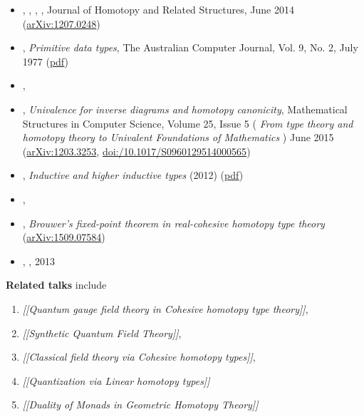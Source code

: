\begin{itemize}
\item {}, , , , Journal of Homotopy and Related Structures, June 2014 (\href{http://arxiv.org/abs/1207.0248}{arXiv:1207.0248})
\item {}, \emph{Primitive data types}, The Australian Computer Journal, Vol. 9, No. 2, July 1977 (\href{http://eprints.utas.edu.au/139/1/PrimitiveData.pdf}{pdf})
\item {}, 
\item {}, \emph{Univalence for inverse diagrams and homotopy canonicity}, Mathematical Structures in Computer Science, Volume 25, Issue 5 ( \emph{From type theory and homotopy theory to Univalent Foundations of Mathematics} ) June 2015 (\href{https://arxiv.org/abs/1203.3253}{arXiv:1203.3253}, \href{https://doi.org/10.1017/S0960129514000565}{doi:/10.1017/S0960129514000565})
\item {}, \emph{Inductive and higher inductive types} (2012) (\href{http://www.math.ias.edu/~mshulman/hottminicourse2012/04induction.pdf}{pdf})
\item {}, 
\item {}, \emph{Brouwer's fixed-point theorem in real-cohesive homotopy type theory} (\href{http://arxiv.org/abs/1509.07584}{arXiv:1509.07584})
\item {}, , 2013
\end{itemize}

\textbf{Related talks} include
\begin{enumerate}%
\item \emph{[[Quantum gauge field theory in Cohesive homotopy type theory]]},
\item \emph{[[Synthetic Quantum Field Theory]]},
\item \emph{[[Classical field theory via Cohesive homotopy types]]},
\item \emph{[[Quantization via Linear homotopy types]]}
\item \emph{[[Duality of Monads in Geometric Homotopy Theory]]}
\end{enumerate}

